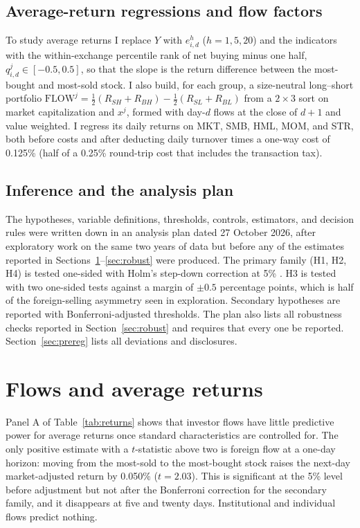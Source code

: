 \documentclass[11pt]{article}
\begin{document}
\subsection{Average-return regressions and flow factors}
To study average returns I replace $Y$ with $e^h_{i,d}$ ($h=1,5,20$) and the indicators with the within-exchange
percentile rank of net buying minus one half, $q^j_{i,d}\in[-0.5,0.5]$, so that the slope is the return difference
between the most-bought and most-sold stock. I also build, for each group, a size-neutral long--short portfolio
$\mathrm{FLOW}^j=\tfrac12(R_{SH}+R_{BH})-\tfrac12(R_{SL}+R_{BL})$ from a $2\times3$ sort on market capitalization and
$x^j$, formed with day-$d$ flows at the close of $d+1$ and value weighted. I regress its daily returns on MKT, SMB, HML,
MOM, and STR, both before costs and after deducting daily turnover times a one-way cost of 0.125\% (half of a
0.25\% round-trip cost that includes the transaction tax).

\subsection{Inference and the analysis plan}
The hypotheses, variable definitions, thresholds, controls, estimators, and decision rules were written down in an
analysis plan dated 27 October 2026, after exploratory work on the same two years of data but before any of the
estimates reported in Sections~\ref{sec:returns}--\ref{sec:robust} were produced. The primary family (H1, H2, H4) is
tested one-sided with Holm's step-down correction at 5\% \citep{holm1979}. H3 is tested with two one-sided tests
\citep{schuirmann1987} against a margin of $\pm0.5$ percentage points, which is half of the foreign-selling asymmetry
seen in exploration. Secondary hypotheses are reported with Bonferroni-adjusted thresholds. The plan also lists all
robustness checks reported in Section~\ref{sec:robust} and requires that every one be reported. Section~\ref{sec:prereg}
lists all deviations and disclosures.

\section{Flows and average returns}\label{sec:returns}

Panel A of Table~\ref{tab:returns} shows that investor flows have little predictive power for average returns once
standard characteristics are controlled for. The only positive estimate with a $t$-statistic above two is foreign
flow at a one-day horizon: moving from the most-sold to the most-bought stock raises the next-day market-adjusted return
by 0.050\% ($t=2.03$). This is significant at the 5\% level before adjustment but not after the Bonferroni correction
for the secondary family, and it disappears at five and twenty days. Institutional and individual flows predict
nothing.
\end{document}
